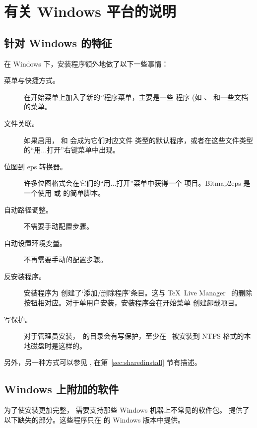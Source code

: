 \documentclass{article}
\begin{document}
\section{有关 Windows 平台的说明}
\label{sec:windows}

\subsection{针对 Windows 的特征}
\label{sec:winfeatures}

在 Windows 下，安装程序额外地做了以下一些事情：
\begin{description}
\item[菜单与快捷方式。] 在开始菜单上加入了新的`\TL{}'程序菜单，主要是一些
\GUI{} 程序 (如 、 和一些文档的菜单。
\item[文件关联。] 如果启用， 和  会成为它们对应文件
类型的默认程序，或者在这些文件类型的“用...打开”右键菜单中出现。
\item[位图到 eps 转换器。] 许多位图格式会在它们的“用...打开”菜单中获得一个
   项目。Bitmap2eps 是一个使用  或
   的简单脚本。
\item[自动路径调整。] 不需要手动配置步骤。
\item[自动设置环境变量。] 不再需要手动的配置步骤。
\item[反安装程序。] 安装程序为 \TL{} 创建了`添加/删除程序'条目。这与
\TeX\ Live Manager \GUI\ 的删除按钮相对应。对于单用户安装，安装程序会在开始菜单
创建卸载项目。
\item[写保护。] 对于管理员安装，\TL\ 的目录会有写保护，至少在 \TL\ 被安装到 NTFS
格式的本地磁盘时是这样的。
\end{description}

另外，另一种方式可以参见 , 在第~\ref{sec:sharedinstall} 节有描述。

\subsection{Windows 上附加的软件}

为了使安装更加完整，\TL{} 需要支持那些 Windows 机器上不常见的软件包。
\TL{} 提供了以下缺失的部分。这些程序只在 \TL{} 的 Windows 版本中提供。
\end{document}
